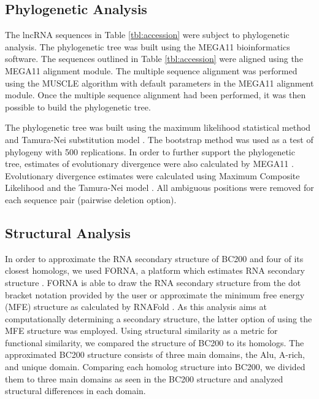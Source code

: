 \documentclass[conference, 11pt]{IEEEtran}
\begin{document}
\subsection{Phylogenetic Analysis}\label{sec:phylo}

The lncRNA sequences in Table \ref{tbl:accession} were subject to phylogenetic analysis.
The phylogenetic tree was built using the MEGA11 \cite{tamura2021mega11} bioinformatics software. 
The sequences outlined in Table \ref{tbl:accession} were aligned using the MEGA11 alignment module. 
The multiple sequence alignment was performed using the MUSCLE algorithm \cite{edgar2004muscle} with default parameters in the MEGA11 alignment module. 
Once the multiple sequence alignment had been performed, it was then possible to build the phylogenetic tree. 

The phylogenetic tree was built using the maximum likelihood statistical method and Tamura-Nei substitution model \cite{tamura1993estimation, tamura2004prospects}. 
The bootstrap method was used as a test of phylogeny with 500 replications.
In order to further support the phylogenetic tree, estimates of evolutionary divergence were also calculated by MEGA11 \cite{tamura2021mega11}. 
Evolutionary divergence estimates were calculated using Maximum Composite Likelihood and the Tamura-Nei model \cite{tamura1993estimation, tamura2004prospects}. 
All ambiguous positions were removed for each sequence pair (pairwise deletion option). 

\subsection{Structural Analysis}\label{sec:structure}

In order to approximate the RNA secondary structure of BC200 and four of its closest homologs, we used FORNA, a platform which estimates RNA secondary structure \cite{kerpedjiev2015forna}. 
FORNA is able to draw the RNA secondary structure from the dot bracket notation provided by the user or approximate the minimum free energy (MFE) structure as calculated by RNAFold \cite{lorenz2011viennarna}. 
As this analysis aims at computationally determining a secondary structure, the latter option of using the MFE structure was employed. 
Using structural similarity as a metric for functional similarity, we compared the structure of BC200 to its homologs.
The approximated BC200 structure consists of three main domains, the Alu, A-rich, and unique domain. 
Comparing each homolog structure into BC200, we divided them to three main domains as seen in the BC200 structure and analyzed structural differences in each domain.
\end{document}
